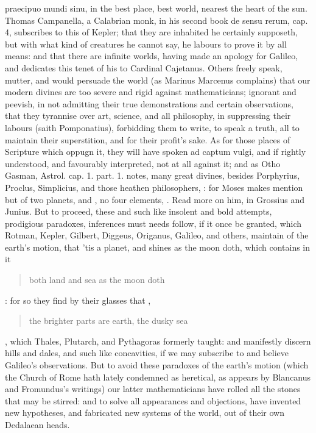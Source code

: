 {praecipuo mundi sinu, in the best place, best world, nearest the heart
of the sun. Thomas Campanella, a Calabrian monk, in his second
book de sensu rerum, cap. 4, subscribes to this of Kepler; that they
are inhabited he certainly supposeth, but with what kind of creatures
he cannot say, he labours to prove it by all means: and that there are
infinite worlds, having made an apology for Galileo, and dedicates this
tenet of his to Cardinal Cajetanus. Others freely speak, mutter, and
would persuade the world (as Marinus Marcenus complains) that our
modern divines are too severe and rigid against mathematicians;
ignorant and peevish, in not admitting their true demonstrations and
certain observations, that they tyrannise over art, science, and all
philosophy, in suppressing their labours (saith Pomponatius),
forbidding them to write, to speak a truth, all to maintain their
superstition, and for their profit's sake. As for those places of
Scripture which oppugn it, they will have spoken ad captum vulgi, and
if rightly understood, and favourably interpreted, not at all against
it; and as Otho Gasman, Astrol. cap. 1. part. 1. notes, many great
divines, besides Porphyrius, Proclus, Simplicius, and those heathen
philosophers, : for Moses makes mention but of two planets, 
and , no four elements, \etc{}. Read more on him, in Grossius and
Junius. But to proceed, these and such like insolent and bold attempts,
prodigious paradoxes, inferences must needs follow, if it once be
granted, which Rotman, Kepler, Gilbert, Diggeus, Origanus, Galileo, and
others, maintain of the earth's motion, that 'tis a planet, and shines
as the moon doth, which contains in it \blockquote{both land and sea as the
moon doth}: for so they find by their glasses that , \blockquote{the brighter parts are earth, the dusky sea}, which Thales,
Plutarch, and Pythagoras formerly taught: and manifestly discern hills
and dales, and such like concavities, if we may subscribe to and
believe Galileo's observations. But to avoid these paradoxes of the
earth's motion (which the Church of Rome hath lately condemned as
heretical, as appears by Blancanus and Fromundus's writings) our latter
mathematicians have rolled all the stones that may be stirred: and to
solve all appearances and objections, have invented new hypotheses, and
fabricated new systems of the world, out of their own Dedalaean heads.

}
